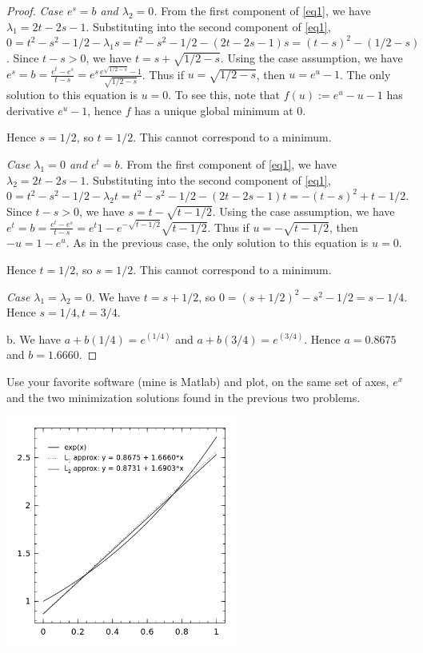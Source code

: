 \documentclass{article}
\begin{document}
\begin{proof}
\emph{Case $e^s = b$ and $\lambda_2 = 0$.} From the first component of \ref{eq1}, we have
$\lambda_1 = 2t - 2s -1$. Substituting into the second component of \ref{eq1}, 
$0 = t^2 - s^2 - 1/2  - \lambda_1 s = t^2 - s^2 - 1/2 - (2t - 2s -1)s = (t - s)^2 - (1/2 -s)$. Since $t - s > 0$, we have 
$t = s + \sqrt{1/2 -s}$.
Using the case assumption, we have $e^s = b = \frac{e^t - e^s}{t-s} = e^s \frac {e^{\sqrt{1/2 - s}} -1} {\sqrt{1/2 - s}}$. Thus if $u = \sqrt{1/2 - s}$,
then $u = e^u -1$.  The only solution to this equation is $u = 0$. To see this, note that $f(u) := e^u - u - 1$ has derivative $e^u -1$, hence $f$ has a unique global minimum at $0$.

Hence $s = 1/2$, so $t = 1/2$. This cannot correspond to a minimum.

\emph{Case $\lambda_1 = 0$ and $e^t = b$.} From the first component of \ref{eq1}, we have
$\lambda_2 = 2t - 2s -1$. Substituting into the second component of \ref{eq1}, 
$0 = t^2 - s^2 - 1/2  - \lambda_2 t = t^2 - s^2 - 1/2 - (2t - 2s -1)t = -(t - s)^2 + t - 1/2$. Since $t -s > 0$, we have $s = t - \sqrt{t - 1/2}$.
Using the case assumption, we have $e^t = b = \frac{e^t - e^s}{t-s} = e^t {1 - e^{-\sqrt{t- 1/2 }}} {\sqrt{t - 1/2}}$. Thus if $u = -\sqrt{t - 1/2}$,
then $-u = 1 - e^u$.  As in the previous case, the only solution to this equation is $u = 0$. 

Hence $t = 1/2$, so $s = 1/2$. This cannot correspond to a minimum.

\emph{Case $\lambda_1 = \lambda_2 = 0$.} We have $t = s + 1/2$, so $0 = (s + 1/2)^2 - s^2 -1/2 = s - 1/4$. Hence $s = 1/4, t = 3/4$.

b. We have $a + b(1/4) = e^{(1/4)}$ and $a + b(3/4) = e^{(3/4)}$.  Hence $a = 0.8675$ and $b = 1.6660$.

\end{proof}

 Use your favorite software (mine is Matlab) and plot, on the same set of axes, $e^x$ and the two minimization solutions found in the previous two problems.

\includegraphics[height = 3in] {approx.png}
\end{document}
